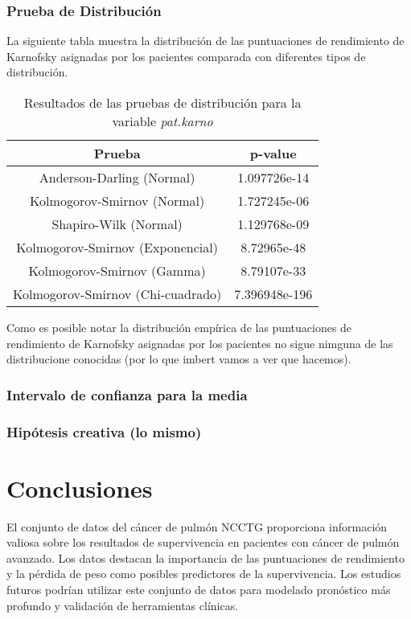 \documentclass[a4paper,12pt]{article}
\begin{document}
    \subsubsection*{Prueba de Distribución}

    La siguiente tabla muestra la distribución de las puntuaciones de rendimiento de Karnofsky asignadas por los pacientes comparada con diferentes tipos de distribución.
    
    \begin{table}[h!]
        \centering
        \begin{tabular}{|c|c|}
            \hline
            \textbf{Prueba} & \textbf{p-value} \\
            \hline
            Anderson-Darling (Normal) & 1.097726e-14 \\
            \hline
            Kolmogorov-Smirnov (Normal) & 1.727245e-06 \\
            \hline
            Shapiro-Wilk (Normal) & 1.129768e-09 \\
            \hline
            Kolmogorov-Smirnov (Exponencial) & 8.72965e-48 \\
            \hline
            Kolmogorov-Smirnov (Gamma) & 8.79107e-33 \\
            \hline
            Kolmogorov-Smirnov (Chi-cuadrado) & 7.396948e-196 \\
            \hline
        \end{tabular}
        \caption{Resultados de las pruebas de distribución para la variable \textit{pat.karno}}
        \label{tab:pruebas_distribucion_pat_karno}
    \end{table}

    Como es posible notar la distribución empírica de las puntuaciones de rendimiento de Karnofsky asignadas por los pacientes no sigue nimguna de las distribucione conocidas (por lo que imbert vamos a ver que hacemos).

    \subsubsection*{Intervalo de confianza para la media}

    \subsubsection*{Hipótesis creativa (lo mismo)}

    

	\section*{Conclusiones}
	El conjunto de datos del cáncer de pulmón NCCTG proporciona información valiosa sobre los resultados de supervivencia en pacientes con cáncer de pulmón avanzado. Los datos destacan la importancia de las puntuaciones de rendimiento y la pérdida de peso como posibles predictores de la supervivencia. Los estudios futuros podrían utilizar este conjunto de datos para modelado pronóstico más profundo y validación de herramientas clínicas.
	
\end{document}

